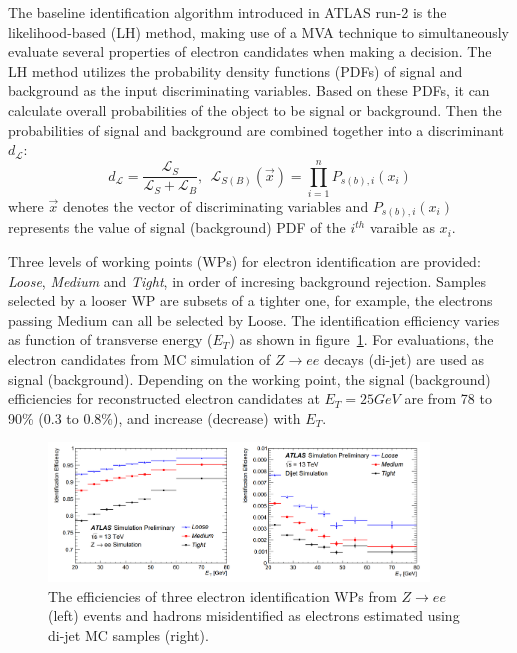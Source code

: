 The baseline identification algorithm introduced in ATLAS run-2 is the likelihood-based (LH) method, making use of a MVA technique to simultaneously evaluate several properties of electron candidates when making a decision.
The LH method utilizes the probability density functions (PDFs) of signal and background as the input discriminating variables.
Based on these PDFs, it can calculate overall probabilities of the object to be signal or background.
Then the probabilities of signal and background are combined together into a discriminant $d_{\mathcal{L}}$:
\begin{equation}
	d_{\mathcal{L}} = \frac{\mathcal{L}_{S}}{\mathcal{L}_{S} + \mathcal{L}_{B}},
	~~ \mathcal{L}_{S(B)}(\vec{x}) = \prod_{i=1}^{n} P_{s(b),i}(x_{i})	
\end{equation}
where $\vec{x}$ denotes the vector of discriminating variables and $P_{s(b),i}(x_{i})$ represents the value of signal (background) PDF of the $i^{th}$ varaible as $x_{i}$.

Three levels of working points (WPs) for electron identification are provided: \textit{Loose}, \textit{Medium} and \textit{Tight}, in order of incresing background rejection.
Samples selected by a looser WP are subsets of a tighter one, for example, the electrons passing Medium can all be selected by Loose.
The identification efficiency varies as function of transverse energy ($E_{T}$) as shown in figure~\ref{fig:ele_IDeff}.
For evaluations, the electron candidates from MC simulation of $Z \rightarrow ee$ decays (di-jet) are used as signal (background).
Depending on the working point, the signal (background) efficiencies for reconstructed electron candidates at $E_{T} = 25 GeV$ are from 78 to 90\% (0.3 to 0.8\%), and increase (decrease) with $E_{T}$.
\begin{figure}[!htb]
  \centering
  \includegraphics[width=0.9\textwidth]{figures/Simulation/ele_id_eff.png}
  \caption{The efficiencies of three electron identification WPs from $Z \rightarrow ee$ (left) events and hadrons misidentified as electrons estimated using di-jet MC samples (right).}
  \label{fig:ele_IDeff}
\end{figure}

